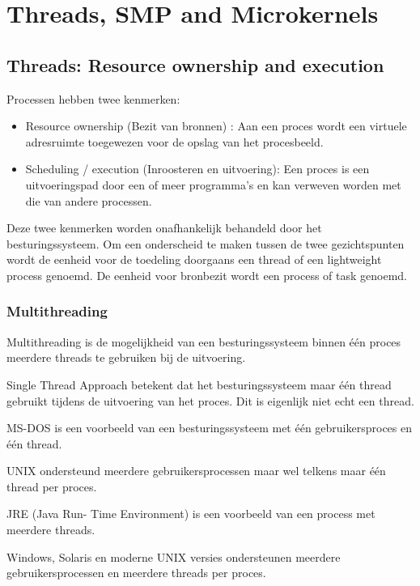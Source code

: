 \section{Threads, SMP and Microkernels}

\subsection{Threads: Resource ownership and execution}

Processen hebben twee kenmerken:

\begin{itemize}
    \item Resource ownership (Bezit van bronnen) : Aan een proces wordt een virtuele adresruimte toegewezen voor de opslag van het procesbeeld.
    \item Scheduling / execution (Inroosteren en uitvoering): Een proces is een uitvoeringspad door een of meer programma’s en kan verweven worden met die van andere processen.
\end{itemize}
	
Deze twee kenmerken worden onafhankelijk behandeld door het besturingssysteem.
Om een onderscheid te maken tussen de twee gezichtspunten wordt de eenheid voor de toedeling doorgaans een thread of een lightweight process genoemd. De eenheid voor bronbezit wordt een process of task genoemd.

\subsubsection{Multithreading}

Multithreading is de mogelijkheid van een besturingssysteem binnen één proces meerdere threads te gebruiken bij de uitvoering.

Single Thread Approach betekent dat het besturingssysteem maar één thread gebruikt tijdens de uitvoering van het proces. Dit is eigenlijk niet echt een thread.

MS-DOS is een voorbeeld van een besturingssysteem met één gebruikersproces en één thread.

UNIX ondersteund meerdere gebruikersprocessen maar wel telkens maar één thread per proces.

JRE (Java Run- Time Environment) is een voorbeeld van een process met meerdere threads.

Windows, Solaris en moderne UNIX versies ondersteunen meerdere gebruikersprocessen en meerdere threads per proces.

